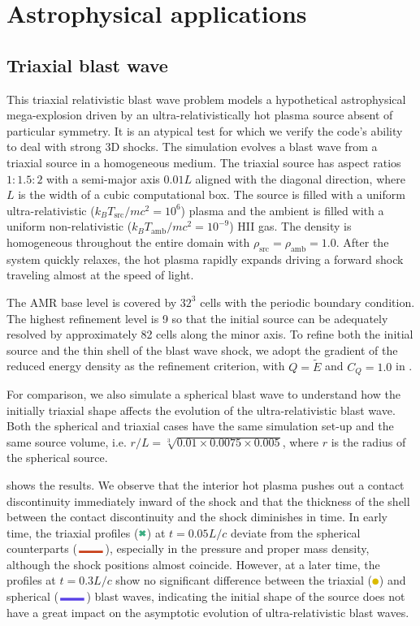 \chapter{Astrophysical applications}
\label{c:astrophysical-applications}
\section{Triaxial blast wave}\label{Ellipsoid blast wave test}
This triaxial relativistic blast wave problem models a hypothetical astrophysical mega-explosion driven by an ultra-relativistically hot plasma source absent of particular symmetry. It is an atypical test for which we verify the code's ability to deal with strong 3D shocks. The simulation evolves a blast wave from a triaxial source in a homogeneous medium. The triaxial source has aspect ratios $1:1.5:2$ with a semi-major axis $0.01L$ aligned with the diagonal direction, where $L$ is the width of a cubic computational box. The source is filled with a uniform ultra-relativistic ($k_{B}T_{\text{src}}/mc^2=10^{6}$) plasma and the ambient is filled with a uniform non-relativistic ($k_{B}T_{\text{amb}}/mc^2=10^{-9}$) HII gas. The density is homogeneous throughout the entire domain with $\rho_{\text{src}}=\rho_{\text{amb}}=1.0$. After the system quickly relaxes, the hot plasma rapidly expands driving a forward shock traveling almost at the speed of light.

The AMR base level is covered by $32^3$ cells with the periodic boundary condition. The highest refinement level is 9 so that the initial source can be adequately resolved by approximately 82 cells along the minor axis. To refine both the initial source and the thin shell of the blast wave shock, we adopt the gradient of the reduced energy density as the refinement criterion, with $Q=\tilde{E}$ and $C_{Q}=1.0$ in .

For comparison, we also simulate a spherical blast wave to understand how the initially triaxial shape affects the evolution of the ultra-relativistic blast wave. Both the spherical and triaxial cases have the same simulation set-up and the same source volume, i.e. $r/L=\sqrt[3]{0.01\times0.0075\times0.005}$, where $r$ is the radius of the spherical source.

 shows the results. We observe that the interior hot plasma pushes out a contact discontinuity immediately inward of the shock and that the thickness of the shell between the contact discontinuity and the shock diminishes in time. In early time, the triaxial profiles ($\MyCross[draw=BlastTriNew,fill=BlastTriNew]$) at $t=0.05L/c$ deviate from the spherical counterparts ($\MySolidLine[draw=BlastSphNew,fill=BlastSphNew]$), especially in the pressure and proper mass density, although the shock positions almost coincide. However, at a later time, the profiles at $t=0.3L/c$ show no significant difference between the triaxial ($\tikz\draw[BlastTriOld,fill=BlastTriOld,line width=1] (0,0) circle (.5ex);$) and spherical ($\MySolidLine[draw=BlastSphOld,fill=BlastSphOld]$) blast waves, indicating the initial shape of the source does not have a great impact on the asymptotic evolution of ultra-relativistic blast waves.

